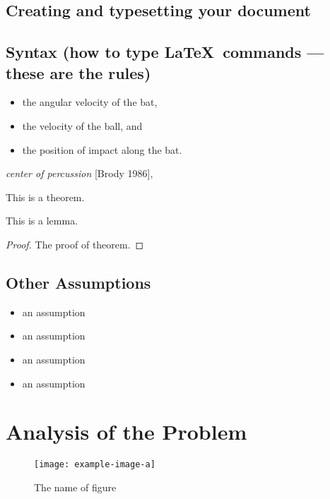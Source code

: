 \documentclass{mcmthesis}
\begin{document}
\subsection{Creating and typesetting your document}

\subsection{Syntax (how to type \LaTeX\ commands --- these
  are the rules)}

\lipsum[3]
\begin{itemize}
\item the angular velocity of the bat,
\item the velocity of the ball, and
\item the position of impact along the bat.
\end{itemize}
\lipsum[4]
\emph{center of percussion} [Brody 1986], \lipsum[5]

\begin{Theorem} \label{thm:latex}
This is a theorem.
\end{Theorem}

\begin{Lemma} \label{thm:tex}
This is a lemma.
\end{Lemma}

\begin{proof}
The proof of theorem.
\end{proof}

\subsection{Other Assumptions}
\lipsum[6]
\begin{itemize}
\item an assumption
\item an assumption
\item an assumption
\item an assumption
\end{itemize}

\lipsum[7]

\section{Analysis of the Problem}
\begin{figure}[h]
    \small
    \centering
    \texttt{[image: example-image-a]}
    \caption{The name of figure} \label{fig:aa}
\end{figure}
\end{document}
